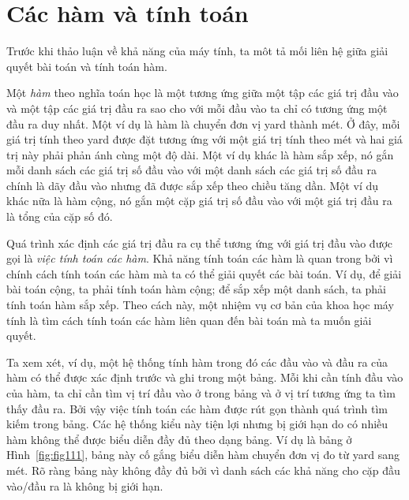 \section{Các hàm và tính toán}
Trước khi thảo luận về khả năng của máy tính, ta môt tả mối liên hệ giữa giải quyết bài
toán và tính toán hàm.

Một \textit{hàm} theo nghĩa toán học là một tương ứng giữa một tập các giá trị đầu vào và
một tập các giá trị đầu ra sao cho với mỗi đầu vào ta chỉ có tương ứng một đầu ra duy
nhất. Một ví dụ là hàm là chuyển đơn vị yard thành mét. Ở đây, mỗi giá trị tính theo yard
được đặt tương ứng với một giá trị tính theo mét và hai giá trị này phải phản ánh cùng một
độ dài. Một ví dụ khác là hàm sắp xếp, nó gắn mỗi danh sách các giá trị số đầu vào với một
danh sách các giá trị số đầu ra chính là dãy đầu vào nhưng đã được sắp xếp theo chiều tăng
dần. Một ví dụ khác nữa là hàm cộng, nó gắn một cặp giá trị số đầu vào với một giá trị đầu
ra là tổng của cặp số đó.

Quá trình xác định các giá trị đầu ra cụ thể tương ứng với giá trị đầu vào được gọi là
\textit{việc tính toán các hàm}. Khả năng tính toán các hàm là quan trong bởi vì chính
cách tính toán các hàm mà ta có thể giải quyết các bài toán. Ví dụ, để giải bài toán cộng,
ta phải tính toán hàm cộng; để sắp xếp một danh sách, ta phải tính toán hàm sắp xếp. Theo
cách này, một nhiệm vụ cơ bản của khoa học máy tính là tìm cách tính toán các hàm liên
quan đến bài toán mà ta muốn giải quyết.

Ta xem xét, ví dụ, một hệ thống tính hàm trong đó các đầu vào và đầu ra của hàm có thể
được xác định trước và ghi trong một bảng. Mỗi khi cần tính đầu vào của hàm, ta chỉ cần
tìm vị trí đầu vào ở trong bảng và ở vị trí tương ứng ta tìm thấy đầu ra. Bởi vậy việc
tính toán các hàm được rút gọn thành quá trình tìm kiếm trong bảng. Các hệ thống kiểu này
tiện lợi nhưng bị giới hạn do có nhiều hàm không thể được biểu diễn đầy đủ theo dạng
bảng. Ví dụ là bảng ở Hình~\ref{fig:fig111}, bảng này cố gắng biểu diễn hàm chuyển đơn vị
đo từ yard sang mét. Rõ ràng bảng này không đầy đủ bởi vì danh sách các khả năng cho cặp
đầu vào/đầu ra là không bị giới hạn.


